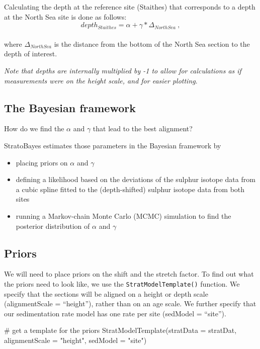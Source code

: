 \documentclass[
  letterpaper,
  DIV=11,
  numbers=noendperiod]{scrartcl}
\newenvironment{Shaded}{\begin{snugshade}}{\end{snugshade}}
\newcommand{\AttributeTok}[1]{\textcolor[rgb]{0.40,0.45,0.13}{#1}}
\newcommand{\CommentTok}[1]{\textcolor[rgb]{0.37,0.37,0.37}{#1}}
\newcommand{\FunctionTok}[1]{\textcolor[rgb]{0.28,0.35,0.67}{#1}}
\newcommand{\NormalTok}[1]{\textcolor[rgb]{0.00,0.23,0.31}{#1}}
\newcommand{\StringTok}[1]{\textcolor[rgb]{0.13,0.47,0.30}{#1}}
\begin{document}
Calculating the depth at the reference site (Staithes) that corresponds
to a depth at the North Sea site is done as follows:
\[depth_{Staithes} = \alpha + \gamma * \Delta_{North Sea}~,\]\\
where \(\Delta_{North Sea}\) is the distance from the bottom of the
North Sea section to the depth of interest.

\emph{Note that depths are internally multiplied by -1 to allow for
calculations as if measurements were on the height scale, and for easier
plotting}.

\subsection{The Bayesian framework}\label{the-bayesian-framework}

How do we find the \(\alpha\) and \(\gamma\) that lead to the best
alignment?

StratoBayes estimates those parameters in the Bayesian framework by

\begin{itemize}
\item
  placing priors on \(\alpha\) and \(\gamma\)
\item
  defining a likelihood based on the deviations of the sulphur isotope
  data from a cubic spline fitted to the (depth-shifted) sulphur isotope
  data from both sites
\item
  running a Markov-chain Monte Carlo (MCMC) simulation to find the
  posterior distribution of \(\alpha\) and \(\gamma\)
\end{itemize}

\subsection{Priors}\label{priors}

We will need to place priors on the shift and the stretch factor. To
find out what the priors need to look like, we use the
\texttt{StratModelTemplate()} function. We specify that the sections
will be aligned on a height or depth scale (alignmentScale =
``height''), rather than on an age scale. We further specify that our
sedimentation rate model has one rate per site (sedModel = ``site'').

\begin{Shaded}
\begin{Highlighting}[]
\CommentTok{\# get a template for the priors}
\FunctionTok{StratModelTemplate}\NormalTok{(}\AttributeTok{stratData =}\NormalTok{ stratDat, }\AttributeTok{alignmentScale =} \StringTok{"height"}\NormalTok{, }\AttributeTok{sedModel =} \StringTok{"site"}\NormalTok{)}
\end{Highlighting}
\end{Shaded}
\end{document}
